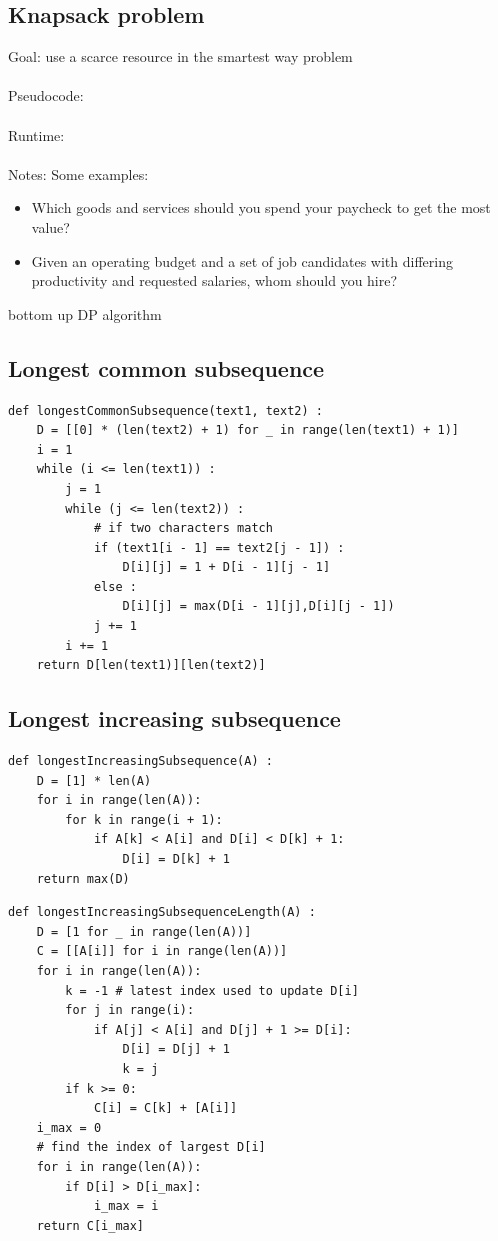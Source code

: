 \documentclass[12pt]{article}
\begin{document}
\subsection*{Knapsack problem}
Goal: use a scarce resource in the smartest way problem
\\\\
Pseudocode:
\\\\
Runtime:
\\\\
Notes:
Some examples:
\begin{itemize}
    \item Which goods and services should you spend your paycheck to get the most value?
    \item Given an operating budget and a set of job candidates with differing productivity and requested salaries, whom should you hire? 
\end{itemize}
bottom up DP algorithm
\subsection*{Longest common subsequence}
\begin{mdframed}
\begin{verbatim}
def longestCommonSubsequence(text1, text2) :
    D = [[0] * (len(text2) + 1) for _ in range(len(text1) + 1)]
    i = 1
    while (i <= len(text1)) :
        j = 1
        while (j <= len(text2)) :
            # if two characters match
            if (text1[i - 1] == text2[j - 1]) :
                D[i][j] = 1 + D[i - 1][j - 1]
            else :
                D[i][j] = max(D[i - 1][j],D[i][j - 1])
            j += 1
        i += 1
    return D[len(text1)][len(text2)]
\end{verbatim}
\end{mdframed}
\subsection*{Longest increasing subsequence}
\begin{mdframed}
\begin{verbatim}
def longestIncreasingSubsequence(A) :
    D = [1] * len(A)
    for i in range(len(A)):
        for k in range(i + 1):
            if A[k] < A[i] and D[i] < D[k] + 1:
                D[i] = D[k] + 1
    return max(D)
\end{verbatim}
\end{mdframed}
\begin{mdframed}
\begin{verbatim}
def longestIncreasingSubsequenceLength(A) :
    D = [1 for _ in range(len(A))]
    C = [[A[i]] for i in range(len(A))]
    for i in range(len(A)):
        k = -1 # latest index used to update D[i]
        for j in range(i):
            if A[j] < A[i] and D[j] + 1 >= D[i]:
                D[i] = D[j] + 1
                k = j
        if k >= 0:
            C[i] = C[k] + [A[i]]
    i_max = 0
    # find the index of largest D[i]
    for i in range(len(A)):
        if D[i] > D[i_max]:
            i_max = i
    return C[i_max]
\end{verbatim}
\end{mdframed}
\end{document}
